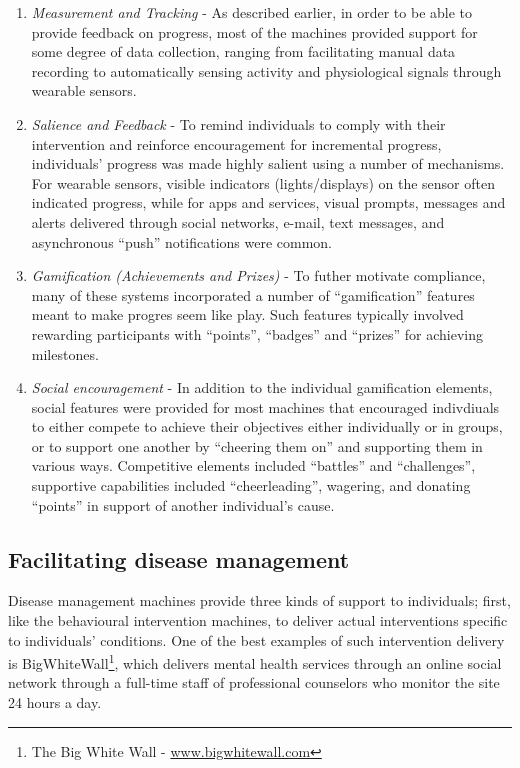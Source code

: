 \documentclass{sig-alternate}
\begin{document}
\begin{enumerate}
\item \emph{Measurement and Tracking} - As described earlier, in order
  to be able to provide feedback on progress, most of the machines
  provided support for some degree of data collection, ranging from
  facilitating manual data recording to automatically sensing activity
  and physiological signals through wearable sensors.
\item \emph{Salience and Feedback} - To remind individuals to comply
  with their intervention and reinforce encouragement for incremental
  progress, individuals' progress was made highly salient using a
  number of mechanisms.  For wearable sensors, visible indicators
  (lights/displays) on the sensor often indicated progress, while for
  apps and services, visual prompts, messages and alerts delivered
  through social networks, e-mail, text messages, and asynchronous
  ``push'' notifications were common.
\item \emph{Gamification (Achievements and Prizes)} - To futher
  motivate compliance, many of these systems incorporated a number of
  ``gamification'' features \cite{Deterding:2011:GUG:1979742.1979575}
  meant to make progres seem like play.  Such features typically
  involved rewarding participants with ``points'', ``badges'' and
  ``prizes'' for achieving milestones.
\item \emph{Social encouragement} - In addition to the individual
  gamification elements, social features were provided for most
  machines that encouraged indivdiuals to either compete to achieve
  their objectives either individually or in groups, or to support one
  another by ``cheering them on'' and supporting them in various ways.
  Competitive elements included ``battles'' and ``challenges'', supportive
  capabilities included ``cheerleading'', wagering, and donating ``points''
  in support of another individual's cause.
\end{enumerate}

\subsection{Facilitating disease management}
Disease management machines provide three kinds of support to
individuals; first, like the behavioural intervention machines, to
deliver actual interventions specific to individuals' conditions.  One
of the best examples of such intervention delivery is BigWhiteWall\footnote{The Big White Wall - \url{www.bigwhitewall.com}},
which delivers mental health services through an online social network
through a full-time staff of professional counselors who monitor the
site 24 hours a day.
\end{document}
